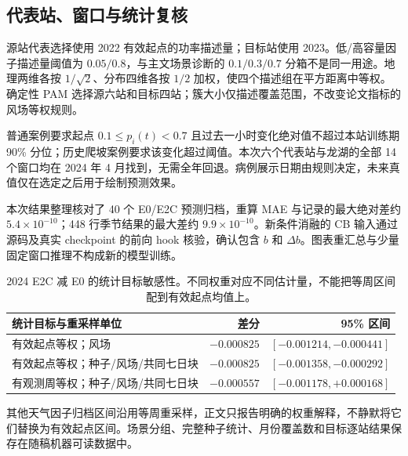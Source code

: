 \subsection{代表站、窗口与统计复核}
源站代表选择使用 2022 有效起点的功率描述量；目标站使用 2023。低/高容量因子描述量阈值为 $0.05/0.8$，与主文场景诊断的 $0.1/0.3/0.7$ 分箱不是同一用途。地理两维各按 $1/\sqrt2$、分布四维各按 $1/2$ 加权，使四个描述组在平方距离中等权。确定性 PAM 选择源六站和目标四站；簇大小仅描述覆盖范围，不改变论文指标的风场等权规则。

普通案例要求起点 $0.1\leq p_i(t)<0.7$ 且过去一小时变化绝对值不超过本站训练期 90\% 分位；历史爬坡案例要求该变化超过阈值。本次六个代表站与龙湖的全部 14 个窗口均在 2024 年 4 月找到，无需全年回退。病例展示日期由规则决定，未来真值仅在选定之后用于绘制预测效果。

本次结果整理核对了 40 个 E0/E2C 预测归档，重算 MAE 与记录的最大绝对差约 $5.4\times10^{-10}$；448 行季节结果的最大差约 $9.9\times10^{-10}$。新条件消融的 CB 输入通过源码及真实 checkpoint 的前向 hook 核验，确认包含 $b$ 和 $\Delta b$。图表重汇总与少量固定窗口推理不构成新的模型训练。

\begin{table}[tbp]
 \centering\small
 \caption{2024 E2C 减 E0 的统计目标敏感性。不同权重对应不同估计量，不能把等周区间配到有效起点均值上。}
 \label{tab:weights}
 \begin{tabular}{lrr}\toprule
 统计目标与重采样单位 & 差分 & 95\% 区间 \\
 \midrule
 有效起点等权；风场 & $-0.000825$ & $[-0.001214,-0.000441]$ \\
 有效起点等权；种子/风场/共同七日块 & $-0.000825$ & $[-0.001358,-0.000292]$ \\
 有观测周等权；种子/风场/共同七日块 & $-0.000557$ & $[-0.001178,+0.000168]$ \\
 \bottomrule\end{tabular}
\end{table}
其他天气因子归档区间沿用等周重采样，正文只报告明确的权重解释，不静默将它们替换为有效起点区间。场景分组、完整种子统计、月份覆盖数和目标逐站结果保存在随稿机器可读数据中。

